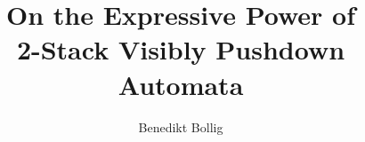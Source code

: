 \documentclass{LMCS}
\begin{document}
\renewcommand{\arraystretch}{1.4}


\newcommand{\state}{\sphere}
\newcommand{\cstate}{\sphere_c}

\newcommand{\Buchi}{B{\"u}chi\xspace}

\newcommand{\AllSpheres}{\mathit{Spheres}}
\newcommand{\Spheres}{\mathit{Spheres}}

\newcommand{\AlleSpheres}{\mathit{eSpheres}}

\newcommand{\core}{\mathit{core}}
\newcommand{\espheremap}{\mathit{esphere}}
\newcommand{\labeling}{\mathit{label}}
\newcommand{\inst}{\mathit{col}}
\newcommand{\col}{\mathit{col}}
\newcommand{\const}{\#\mathit{Col}}

\newcommand{\State}{\mathcal{E}}
\newcommand{\cState}{\mathcal{E}_c}


\newcommand{\tW}{{\widetilde{W}}}
\newcommand{\tn}{\widetilde{n}}
\newcommand{\tsuccord}{\widetilde{\succord}}
\newcommand{\tmu}{\widetilde{\mu}}
\newcommand{\tlambda}{\widetilde{\lambda}}
\newcommand{\trho}{\widetilde{\rho}}

\newcommand{\maxN}{\mathit{maxSize}(r)}

\newcommand{\Dir}{\Delta}


\newcommand{\Wleadsto}[4]{#3 \mathrel{{\xhookrightarrow{#2~}}_{#1}} #4}
\newcommand{\Wleadstoeq}[4]{#3 \mathrel{{\xRightarrow{~#2~}}_{#1}} #4}
\newcommand{\longWleadstoeq}[4]{#3 \mathrel{{\xRightarrow{#2~}}_{#1}} #4}

\newcommand{\eWleadsto}[5]{#3 \mathrel{{\xhookrightarrow[{#5}]{#2}}}
#4}



\newcommand{\Paths}{\mathit{Paths}}


\title[On the Expressive Power of 2-Stack Visibly Pushdown Automata]{On
  the Expressive Power of\\2-Stack Visibly Pushdown Automata}

\author[B.~Bollig]{Benedikt Bollig}
 \address{LSV, ENS Cachan, CNRS ---
   61, avenue du Pr{\'e}sident Wilson,
   94235 Cachan Cedex, France}

 
\end{document}
